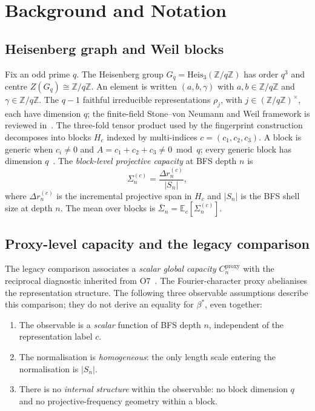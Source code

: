 \documentclass[11pt]{article}
\begin{document}
  \section{Background and Notation}
  \label{sec:background}

  \subsection{Heisenberg graph and Weil blocks}
    \label{sec:heis}

    Fix an odd prime $q$.
    The Heisenberg group $G_q = \mathrm{Heis}_3(\mathbb{Z}/q\mathbb{Z})$ has order $q^3$ and centre
    $Z(G_q) \cong \mathbb{Z}/q\mathbb{Z}$.
    An element is written $(a,b,\gamma)$ with $a,b \in \mathbb{Z}/q\mathbb{Z}$ and
    $\gamma \in \mathbb{Z}/q\mathbb{Z}$.
    The $q-1$ faithful irreducible representations $\rho_j$, with
    $j\in(\mathbb{Z}/q\mathbb{Z})^{\times}$, each have dimension $q$; the finite-field
    Stone--von Neumann and Weil framework is reviewed in~\cite{GurevichHadani2009}.
    The three-fold tensor product used by the fingerprint construction decomposes into blocks
    $H_c$ indexed by multi-indices $c=(c_1,c_2,c_3)$.
    A block is generic when $c_i\neq0$ and $A=c_1+c_2+c_3\neq0\bmod q$; every generic block has
    dimension $q$~\cite{Beau2026a16}.
    The \emph{block-level projective capacity} at BFS depth $n$ is
    \begin{equation}
      \label{eq:sigma_def}
      \Sigma_n^{(c)} = \frac{\Delta r_n^{(c)}}{|S_n|},
    \end{equation}
    where $\Delta r_n^{(c)}$ is the incremental projective span in $H_c$ and
    $|S_n|$ is the BFS shell size at depth $n$.
    The mean over blocks is $\bar{\Sigma}_n = \mathbb{E}_c[\Sigma_n^{(c)}]$.

  \subsection{Proxy-level capacity and the legacy comparison}
    \label{sec:o7}

    The legacy comparison associates a \emph{scalar global capacity}
    $C_n^{\mathrm{proxy}}$ with the reciprocal diagnostic inherited from O7~\cite{Beau2026a11}.
    The Fourier-character proxy abelianises the representation structure.
    The following three observable assumptions describe this comparison; they do not derive
    an equality for $\beta^{*}$, even together:
    \begin{enumerate}
      \item[(A1)] The observable is a \emph{scalar} function of BFS depth $n$, independent of the
      representation label $c$.
      \item[(A2)] The normalisation is \emph{homogeneous}: the only length scale entering the
      normalisation is $|S_n|$.
      \item[(A3)] There is no \emph{internal structure} within the observable: no block dimension $q$
      and no projective-frequency geometry within a block.
    \end{enumerate}
\end{document}
